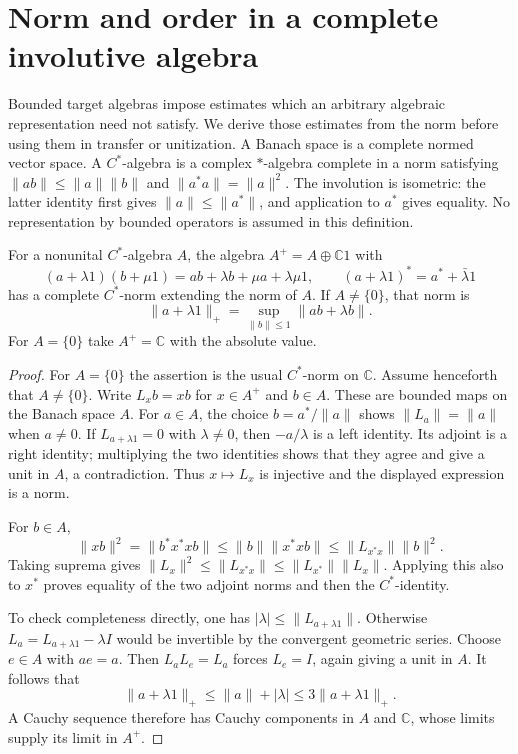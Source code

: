 \documentclass[11pt]{article}
\numberwithin{equation}{section}
\newcommand{\C}{\mathbb C}
\begin{document}
\section{Norm and order in a complete involutive algebra}
\label{sec:cstar-prerequisites}

Bounded target algebras impose estimates which an arbitrary algebraic
representation need not satisfy.  We derive those estimates from the norm
before using them in transfer or unitization.
A Banach space is a complete normed vector space.
A $C^*$-algebra is a complex $*$-algebra complete in a norm satisfying
$\|ab\|\leq\|a\|\|b\|$ and $\|a^*a\|=\|a\|^2$.
The involution is isometric: the latter identity first gives
$\|a\|\leq\|a^*\|$, and application to $a^*$ gives equality.
No representation by bounded operators is assumed in this definition.

\begin{lemma}
For\label{lem:cstar-adjoin} a nonunital $C^*$-algebra $A$, the algebra $A^+=A\oplus\C1$ with
\[
 (a+\lambda1)(b+\mu1)=ab+\lambda b+\mu a+\lambda\mu1,
 \qquad (a+\lambda1)^*=a^*+\bar\lambda1
\]
has a complete $C^*$-norm extending the norm of $A$.
If $A\ne\{0\}$, that norm is
\[
 \|a+\lambda1\|_+=\sup_{\|b\|\leq1}\|ab+\lambda b\|.
\]
For $A=\{0\}$ take $A^+=\C$ with the absolute value.
\end{lemma}

\begin{proof}
For $A=\{0\}$ the assertion is the usual $C^*$-norm on $\C$.
Assume henceforth that $A\ne\{0\}$.
Write $L_xb=xb$ for $x\in A^+$ and $b\in A$.
These are bounded maps on the Banach space $A$.
For $a\in A$, the choice $b=a^*/\|a\|$ shows
$\|L_a\|=\|a\|$ when $a\ne0$.
If $L_{a+\lambda1}=0$ with $\lambda\ne0$, then $-a/\lambda$ is a left
identity.  Its adjoint is a right identity; multiplying the two identities
shows that they agree and give a unit in $A$, a contradiction.
Thus $x\mapsto L_x$ is injective and the displayed expression is a norm.

For $b\in A$,
\[
 \|xb\|^2=\|b^*x^*xb\|
 \leq\|b\|\|x^*xb\|\leq\|L_{x^*x}\|\|b\|^2.
\]
Taking suprema gives
$\|L_x\|^2\leq\|L_{x^*x}\|\leq\|L_{x^*}\|\|L_x\|$.
Applying this also to $x^*$ proves equality of the two adjoint norms and
then the $C^*$-identity.

To check completeness directly, one has $|\lambda|\leq\|L_{a+\lambda1}\|$.
Otherwise $L_a=L_{a+\lambda1}-\lambda I$ would be invertible by the
convergent geometric series.  Choose $e\in A$ with $ae=a$.
Then $L_aL_e=L_a$ forces $L_e=I$, again giving a unit in $A$.
It follows that
\[
 \|a+\lambda1\|_+\leq\|a\|+|\lambda|
 \leq3\|a+\lambda1\|_+.
\]
A Cauchy sequence therefore has Cauchy components in $A$ and $\C$, whose
limits supply its limit in $A^+$.
\end{proof}
\end{document}
